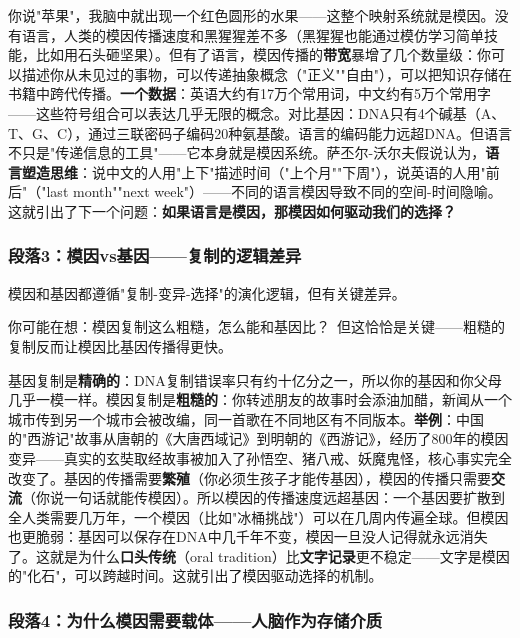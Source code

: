 \documentclass[../main.tex]{subfiles}
\begin{document}
你说"苹果"，我脑中就出现一个红色圆形的水果——这整个映射系统就是模因。没有语言，人类的模因传播速度和黑猩猩差不多（黑猩猩也能通过模仿学习简单技能，比如用石头砸坚果）。但有了语言，模因传播的\textbf{带宽}暴增了几个数量级：你可以描述你从未见过的事物，可以传递抽象概念（"正义""自由"），可以把知识存储在书籍中跨代传播。\textbf{一个数据}：英语大约有17万个常用词，中文约有5万个常用字——这些符号组合可以表达几乎无限的概念。对比基因：DNA只有4个碱基（A、T、G、C），通过三联密码子编码20种氨基酸。语言的编码能力远超DNA。但语言不只是"传递信息的工具"——它本身就是模因系统。萨丕尔-沃尔夫假说认为，\textbf{语言塑造思维}：说中文的人用"上下"描述时间（"上个月""下周"），说英语的人用"前后"（"last month""next week"）——不同的语言模因导致不同的空间-时间隐喻。这就引出了下一个问题：\textbf{如果语言是模因，那模因如何驱动我们的选择？}

	\subsubsection*{段落3：模因vs基因——复制的逻辑差异}

	模因和基因都遵循"复制-变异-选择"的演化逻辑，但有关键差异。

	\begin{tcolorbox}[colback=yellow!5, title=\textit{读者行为预测}]

		你可能在想：模因复制这么粗糙，怎么能和基因比？\ 但这恰恰是关键——粗糙的复制反而让模因比基因传播得更快。

	\end{tcolorbox}

基因复制是\textbf{精确的}：DNA复制错误率只有约十亿分之一，所以你的基因和你父母几乎一模一样。模因复制是\textbf{粗糙的}：你转述朋友的故事时会添油加醋，新闻从一个城市传到另一个城市会被改编，同一首歌在不同地区有不同版本。\textbf{举例}：中国的"西游记"故事从唐朝的《大唐西域记》到明朝的《西游记》，经历了800年的模因变异——真实的玄奘取经故事被加入了孙悟空、猪八戒、妖魔鬼怪，核心事实完全改变了。基因的传播需要\textbf{繁殖}（你必须生孩子才能传基因），模因的传播只需要\textbf{交流}（你说一句话就能传模因）。所以模因的传播速度远超基因：一个基因要扩散到全人类需要几万年，一个模因（比如"冰桶挑战"）可以在几周内传遍全球。但模因也更脆弱：基因可以保存在DNA中几千年不变，模因一旦没人记得就永远消失了。这就是为什么\textbf{口头传统}（oral tradition）比\textbf{文字记录}更不稳定——文字是模因的"化石"，可以跨越时间。这就引出了模因驱动选择的机制。

	\subsubsection*{段落4：为什么模因需要载体——人脑作为存储介质}
\end{document}
